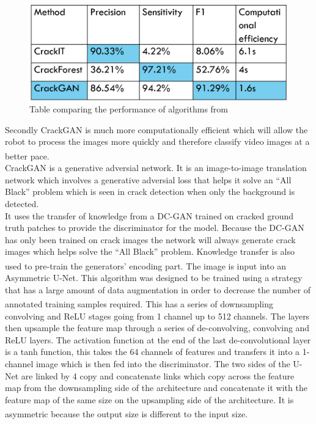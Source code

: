 \documentclass[11pt]{article}		%
\newcommand{\supercite}[1]{\textsuperscript{\cite{#1}}}		%
\begin{document}
        	\begin{figure}[h]
				\centering
				\includegraphics[scale=0.75]{CrackGAN_comparisonv1.PNG}
				\caption{Table comparing the performance of algorithms from \cite{CrackGAN1}}
				\label{crack_comparison}
			\end{figure}
        
	        Secondly CrackGAN is much more computationally efficient which will allow the robot to process the images more quickly and therefore classify video images at a better pace.\supercite{CrackGAN1}
			\\
			CrackGAN is a generative adversial network. 
			It is an image-to-image translation network which involves a generative adversial loss that helps it solve an “All Black” problem which is seen in crack detection when only the background is detected.
			\\
			It uses the transfer of knowledge from a DC-GAN trained on cracked ground truth patches to provide the discriminator for the model. Because the DC-GAN has only been trained on crack images the network will always generate crack images which helps solve the “All Black” problem. Knowledge transfer is also used to pre-train the generators’ encoding part.\supercite{CrackGAN1} 
	        The image is input into an Asymmetric U-Net. This algorithm was designed to be trained using a strategy that has a large amount of data augmentation in order to decrease the number of annotated training samples required.\supercite{U-Net} This has a series of downsampling convolving and ReLU stages going from 1 channel up to 512 channels. The layers then upsample the feature map through a series of de-convolving, convolving and ReLU layers. The activation function at the end of the last de-convolutional layer is a tanh function, this takes the 64 channels of features and transfers it into a 1-channel image which is then fed into the discriminator. The two sides of the U-Net are linked by 4 copy and concatenate links which copy across the feature map from the downsampling side of the architecture and concatenate it with the feature map of the same size on the upsampling side of the architecture. It is asymmetric because the output size is different to the input size.\supercite{U-Net}
        
\end{document}
